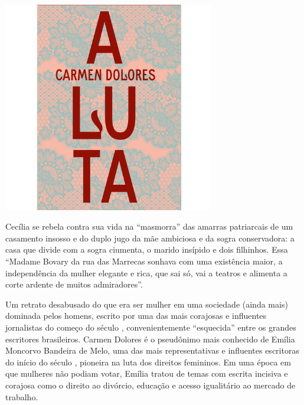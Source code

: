 \begin{center}
\hspace*{-2.5cm}
\hspace*{2.5cm}\includegraphics[width=92mm]{./grid/luta.jpg}
\end{center}

\hspace*{-7cm}\hrulefill\hspace*{-7cm}

\medskip

\noindent{}Cecília se rebela contra sua vida na “masmorra” das amarras patriarcais de um casamento insosso e do duplo jugo da mãe ambiciosa e da sogra conservadora: a casa que divide com a sogra ciumenta, o marido insípido e dois filhinhos. Essa “Madame Bovary da rua das Marrecas sonhava com uma existência maior, a independência da mulher elegante e rica, que sai só, vai a teatros e alimenta a corte ardente de muitos admiradores”.

Um retrato desabusado do que era ser mulher em uma sociedade (ainda mais) dominada pelos homens, escrito por uma das mais corajosas e influentes jornalistas do começo do século , convenientemente “esquecida” entre os grandes escritores brasileiros. Carmen Dolores é o pseudônimo mais conhecido de Emília Moncorvo Bandeira de Melo, uma das mais representativas e influentes escritoras do início do século , pioneira na luta dos direitos femininos. Em uma época em que mulheres não podiam votar, Emília tratou de temas com escrita incisiva e corajosa como o direito ao divórcio, educação e acesso igualitário ao mercado de trabalho. 


